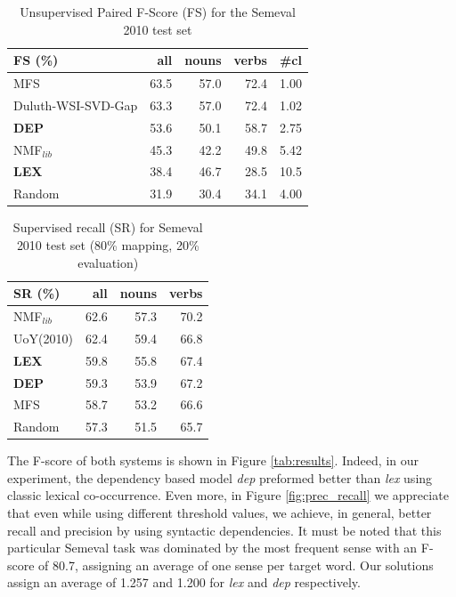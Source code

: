 \begin{table}[]
\centering

\begin{tabular}{@{}lrrrr@{}}
\toprule
\textbf{FS (\%)} & \textbf{all} & \textbf{nouns} & \textbf{verbs} & \textbf{\#cl} \\ \midrule
MFS & 63.5 & 57.0 & 72.4 & 1.00 \\
Duluth-WSI-SVD-Gap & 63.3 & 57.0 & 72.4 & 1.02 \\
\textbf{DEP} & 53.6 & 50.1 & 58.7 & 2.75 \\
NMF$_{lib}$&45.3&42.2&49.8&5.42\\
\textbf{LEX} & 38.4 & 46.7 & 28.5 & 10.5 \\
Random & 31.9 & 30.4 & 34.1 & 4.00 \\ \bottomrule
\end{tabular}
\caption{Unsupervised Paired F-Score (FS) for the Semeval 2010 test set}
\label{tab:sem2010_FS}
\end{table}


\begin{table}[h!]
\centering

\begin{tabular}{@{}lrrr@{}}
\toprule
\textbf{SR (\%)} & \textbf{all} & \textbf{nouns} & \textbf{verbs} \\ \midrule
NMF$_{lib}$&62.6&57.3&70.2\\
UoY(2010) & 62.4 & 59.4 & 66.8 \\

\textbf{LEX} & 59.8 & 55.8 & 67.4 \\
\textbf{DEP} & 59.3 & 53.9 & 67.2 \\
MFS & 58.7 & 53.2 & 66.6 \\
Random & 57.3 & 51.5 & 65.7 \\ \bottomrule

\end{tabular}

\caption{Supervised recall (SR) for Semeval 2010 test set (80\% mapping, 20\% evaluation)}
\label{tab:sem2010_SR}
\end{table}



The F-score of both systems is shown in Figure \ref{tab:results}. Indeed, in our experiment, the dependency based model \textit{dep} preformed better than \textit{lex} using classic lexical co-occurrence. Even more, in Figure \ref{fig:prec_recall} we   appreciate that even while using different threshold values, we achieve, in general, better recall and precision by using syntactic dependencies. It must be noted  that this particular Semeval task was dominated by the most frequent sense with an F-score of 80.7, assigning an average of one sense per target word. Our solutions assign an average of 1.257 and 1.200 for \textit{lex} and \textit{dep} respectively.



